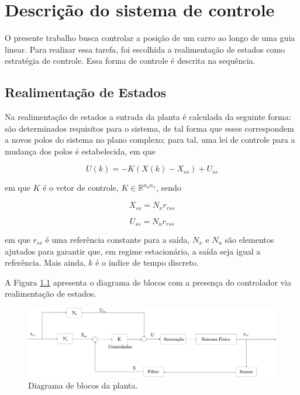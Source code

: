 \chapter{Descrição do sistema de controle}

O presente trabalho busca controlar a posição de um carro ao longo de uma guia linear. Para realizar essa tarefa, foi escolhida a realimentação de estados como estratégia de controle. Essa forma de controle é descrita na sequência.

\section{Realimentação de Estados}

Na realimentação de estados a entrada da planta é calculada da seguinte forma: são determinados requisitos para o sistema, de tal forma que esses correspondem a novos polos do sistema no plano complexo; para tal, uma lei de controle para a mudança dos polos é estabelecida, em que  

\begin{equation}
    U(k) = -K (X(k) - X_{ss}) + U_{ss}
    \label{vetor_controle_realimentacao}
\end{equation}

\noindent em que $K$ é o vetor de controle, $K \in \mathbb{R}^{n_u n_x}$, sendo

\begin{equation}
    X_{ss} = N_x r_{rss}
\end{equation}

\begin{equation}
    U_{ss} = N_u r_{rss}
\end{equation}

\noindent em que $r_{ss}$ é uma referência constante para a saída, $N_x$ e $N_u$ são elementos ajutados para garantir que, em regime estacionário, a saída seja igual a referência. Mais ainda, $k$ é o índice de tempo discreto. 

A Figura \ref{fig:diagrama_blocos} apresenta o diagrama de blocos com a presença do controlador via realimentação de estados.

\begin{figure}[H]
    \centering
    \includegraphics[width=1\linewidth]{figuras/diagrama_blocos.png}
    \caption[Diagrama de blocos da planta]{Diagrama de blocos da planta.}
    \label{fig:diagrama_blocos}
\end{figure}

